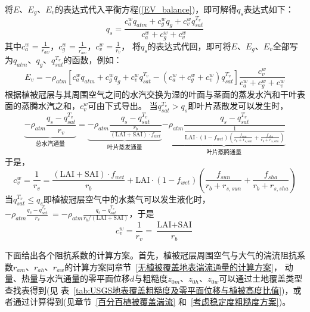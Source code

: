 将$E$、$E_{g}$、$E_{v}$的表达式代入平衡方程(\ref{EV_balance})，即可解得$q_s$表达式如下：
\begin{equation}\label{Eg_2}
q_{s}=\frac{c_{a}^{w} q_{atm}+c_{g}^{w} q_{g}+c_{v}^{w} q_{s a t}^{T_{v}}}{c_{a}^{w}+c_{g}^{w}+c_{v}^{w}}
\end{equation}
其中$c_a^w=\frac{1}{r_{aw}}$，$c_g^w=\frac{1}{r_{aw}^\prime}$，$c_v^w=\frac{1}{r_{v}}$，
将$q_s$的表达式代回，即可将$E$、$E_{g}$、$E_{v}$全部写为$q_{atm}$、$q_g$、$q_{sat}^{T_v}$的函数，例如：
\begin{equation}\label{Ev}
E_{v}=-\rho_{atm}\left[c_{a}^{w} q_{atm}+c_{g}^{w} q_{g}+c_{v}^{w} q_{s a t}^{T_{v}}-
\left(c_{a}^{w}+c_{g}^{w}+c_{v}^{w}\right) q_{s a t}^{T_{v}}\right] \frac{c_{v}^{w}}{c_{a}^{w}+c_{g}^{w}+c_{v}^{w}}
\end{equation}
根据植被冠层与其周围空气之间的水汽交换为湿的叶面与茎面的蒸发水汽和干叶表面的蒸腾水汽之和，$c_v^w$可由下式导出。
当$q_{sat}^{T_v}>q_s$即叶片蒸散发可以发生时，%
\begin{equation}
\underbrace{-\rho_{atm} \frac{q_{s}-q_{s a t}^{T_{v}}}{r_{{v }}}}_{\text{总水汽通量}}
=\underbrace{-\rho_{atm} 
\frac{q_{s}-q_{s a t}^{T_{v}}}{\frac{r_{b}}{(\text {LAI}+\text {SAI}) \cdot f_{{wet }}}}}_{\text{叶片蒸发通量}}
\underbrace{-\rho_{atm} \frac{q_{s}-q_{s a t}^{T_{v}}}{\frac{1}{\text {LAI} \cdot \left(1-f_{wet}\right)\left(\frac{f_{sun}}{r_{b}+r_{s,sun}} + \frac{f_{sha}}{r_{b}+r_{s,sha}}\right)}}}_{\text{叶片蒸腾通量}}
\end{equation}
于是，
\begin{equation}
c_{v}^{w}=\frac{1}{r_{v}}=\frac{(\text {LAI}+\text {SAI}) \cdot f_{{wet }}}{r_{b}}+\text {LAI} \cdot \left(1-f_{wet}\right)\left(\frac{f_{sun}}{r_{b}+r_{s,sun}} + \frac{f_{sha}}{r_{b}+r_{s,sha}}\right)
\end{equation}
当$q_{sat}^{T_v}\leqslant q_s$即植被冠层空气中的水蒸气可以发生液化时，
$-\rho_{atm}\frac{q_s-q_{sat}^{T_v}}{r_{v}}\ =-\rho_{atm} \frac{q_s-q_{sat}^{T_v}}{r_b/\left(\text {LAI}+\text {SAI}\right)}$，于是
\begin{equation}
c_{v}^{w}=\frac{1}{r_{{v }}}=\frac{\text {LAI}+\text {SAI}}{r_{b}}
\end{equation}

下面给出各个阻抗系数的计算方案。首先，植被冠层周围空气与大气的湍流阻抗系数$r_{am}$、$r_{ah}$、$r_{aw}$的计算方案同章节~\ref{无植被覆盖地表湍流通量的计算方案}，
动量、热量与水汽通量的零平面位移$d$与粗糙度$z_{0m}$、$z_{0h}$、$z_{0w}$可以通过土地覆盖类型查找表得到(见
表~\ref{tab:USGS地表覆盖粗糙度及零平面位移与植被高度比值})，或者通过计算得到(见章节~\ref{百分百植被覆盖湍流} 和~\ref{考虑稳定度粗糙度方案})。

